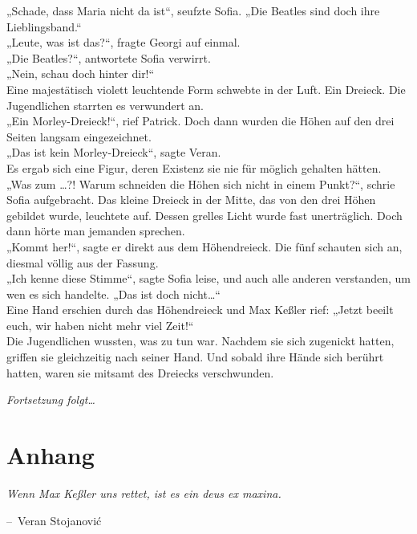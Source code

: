\documentclass[oneside]{memoir}
\makeatletter
\newenvironment{chapquote}[2][2em]
  {\setlength{\@tempdima}{#1}%
   \def\chapquote@author{#2}%
   \parshape 1 \@tempdima \dimexpr\textwidth-2\@tempdima\relax%
   \itshape}
  {\par\normalfont\hfill--\ \chapquote@author\hspace*{\@tempdima}\par\bigskip}
\makeatother
\begin{document}
„Schade, dass Maria nicht da ist“, seufzte Sofia. „Die Beatles sind doch ihre Lieblingsband.“ \\
„Leute, was ist das?“, fragte Georgi auf einmal. \\
„Die Beatles?“, antwortete Sofia verwirrt. \\
„Nein, schau doch hinter dir!“ \\
Eine majestätisch violett leuchtende Form schwebte in der Luft. Ein Dreieck. Die Jugendlichen starrten es verwundert an. \\
„Ein Morley-Dreieck!“, rief Patrick. Doch dann wurden die Höhen auf den drei Seiten langsam eingezeichnet. \\
„Das ist kein Morley-Dreieck“, sagte Veran. \\
Es ergab sich eine Figur, deren Existenz sie nie für möglich gehalten hätten. \\
„Was zum \ldots?! Warum schneiden die Höhen sich nicht in einem Punkt?“, schrie Sofia aufgebracht. Das kleine Dreieck in der Mitte, das von den drei Höhen gebildet wurde, leuchtete auf. Dessen grelles Licht wurde fast unerträglich. Doch dann hörte man jemanden sprechen. \\
„Kommt her!“, sagte er direkt aus dem Höhendreieck. Die fünf schauten sich an, diesmal völlig aus der Fassung. \\
„Ich kenne diese Stimme“, sagte Sofia leise, und auch alle anderen verstanden, um wen es sich handelte. „Das ist doch nicht\ldots“ \\
Eine Hand erschien durch das Höhendreieck und Max Keßler rief: „Jetzt beeilt euch, wir haben nicht mehr viel Zeit!“ \\
Die Jugendlichen wussten, was zu tun war. Nachdem sie sich zugenickt hatten, griffen sie gleichzeitig nach seiner Hand. Und sobald ihre Hände sich berührt hatten, waren sie mitsamt des Dreiecks verschwunden.
\newpage
\thispagestyle{empty}
\begin{center}
\textit{Fortsetzung folgt\ldots}
\end{center}

\chapter{Anhang}
\begin{chapquote}{Veran Stojanović}
\glqq Wenn Max Keßler uns rettet, ist es ein deus ex maxina.\grqq
\end{chapquote}
\end{document}
